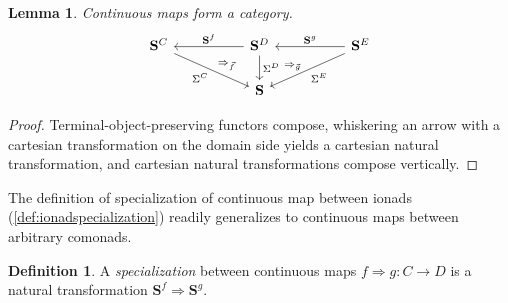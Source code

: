 \documentclass[11pt, oneside, article]{memoir}
\theoremstyle{plain}
\newtheorem{lemma}[theorem]{Lemma}
\theoremstyle{definition}
\newtheorem{definition}[def]{Definition}
\theoremstyle{remark}
\newenvironment{example}
{\renewcommand\qedsymbol{$\lrcorner$}%
  \pushQED{\qed}\myexample}
{\popQED\endmyexample}
\newcommand{\namedcat}[1]{\mathbf{#1}}
\newcommand{\cat}[1]{\mathbf{#1}}
\newcommand{\spa}[1]{\mathbf{#1}}
\newcommand{\Set}{\namedcat{Set}}
\newcommand{\Con}{\namedcat{Cmd}^\natural}
\newcommand{\ConS}{\Con_\mathrm{s}}
\newcommand{\ConSSet}{\ConS}
\newcommand{\CoalgOn}[2]{{#2}^{#1}}
\newcommand{\CoalgS}[1]{\CoalgOn{#1}{\bS}}
\newcommand{\carr}{\Sigma}
\newcommand{\car}[1]{\carr^{#1}}
\newcommand{\carC}{\car{\cC}}
\newcommand{\carD}{\car{\cD}}
\newcommand{\con}[2]{{#1}^{#2}}
\newcommand{\connat}[1]{\vec{#1}}
\newcommand{\AccCon}{\Con_{\mathrm{small}}}
\newcommand{\AccConSet}{\AccCon}
\newcommand{\cmnd}[1]{{#1}}
\newcommand{\cC}{\cmnd{C}}
\newcommand{\cD}{\cmnd{D}}
\newcommand{\cE}{\cmnd{E}}
\newcommand{\bC}{\cat{C}}
\newcommand{\bD}{\cat{D}}
\newcommand{\bS}{\cat{S}}
\newcommand{\tX}{\spa{X}}
\newcommand{\tY}{\spa{Y}}
\newcommand{\CS}{\CoalgS{\cC}}
\newcommand{\DS}{\CoalgS{\cD}}
\newcommand{\Final}{Terminal-object-preserving}
\newcommand{\cartesian}{cartesian}
\begin{document}
\begin{lemma}
  Continuous maps form a category.\vspace{-.5em}
  \[\begin{tikzcd}[column sep=50pt]
      \CS & \DS & {\CoalgS{\cE}} \\
      & \bS
      \arrow[""{name=0, anchor=center, inner sep=0}, "\carC"', from=1-1, to=2-2]
      \arrow["\con{\bS}{f}"', from=1-2, to=1-1]
      \arrow[""{name=1, anchor=center, inner sep=0}, "\carD", from=1-2, to=2-2]
      \arrow["\con{\bS}{g}"', from=1-3, to=1-2]
      \arrow[""{name=2, anchor=center, inner sep=0}, "{\car{\cE}}", from=1-3, to=2-2]
      \arrow["{\Rightarrow_{\connat{f}}}"{pos=0.3}, shift right=3pt, draw=none, from=0, to=1]
      \arrow["{\Rightarrow_{\connat{g}}}"{pos=0.7}, shift right=3pt, draw=none, from=1, to=2]
    \end{tikzcd}\]
\end{lemma}
\begin{proof}
  {\Final} functors compose, whiskering an arrow with a {\cartesian}
  transformation on the domain side yields a {\cartesian} natural
  transformation, and {\cartesian} natural transformations compose
  vertically.
\end{proof}

The definition of specialization of continuous map between ionads
(\cref{def:ionadspecialization}) readily generalizes to continuous
maps between arbitrary comonads.

\begin{definition}\label{def:specialization}
  A \emph{specialization} between continuous maps
  $f \Rightarrow g \colon \cC \to \cD$ is a natural transformation
  $\con{\bS}{f} \Rightarrow \con{\bS}{g}$.
\end{definition}




\end{document}

